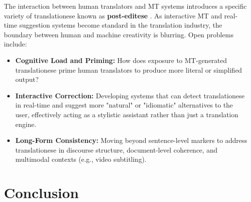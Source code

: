 \documentclass[11pt,a4paper]{article}
\begin{document}
The interaction between human translators and MT systems introduces a specific variety of translationese known as \textbf{post-editese} \cite{toral2019post}. As interactive MT and real-time suggestion systems become standard in the translation industry, the boundary between human and machine creativity is blurring. Open problems include:
\begin{itemize}
    \item \textbf{Cognitive Load and Priming:} How does exposure to MT-generated translationese prime human translators to produce more literal or simplified output?
    \item \textbf{Interactive Correction:} Developing systems that can detect translationese in real-time and suggest more "natural" or "idiomatic" alternatives to the user, effectively acting as a stylistic assistant rather than just a translation engine.
    \item \textbf{Long-Form Consistency:} Moving beyond sentence-level markers to address translationese in discourse structure, document-level coherence, and multimodal contexts (e.g., video subtitling).
\end{itemize}

\section{Conclusion}
\end{document}
